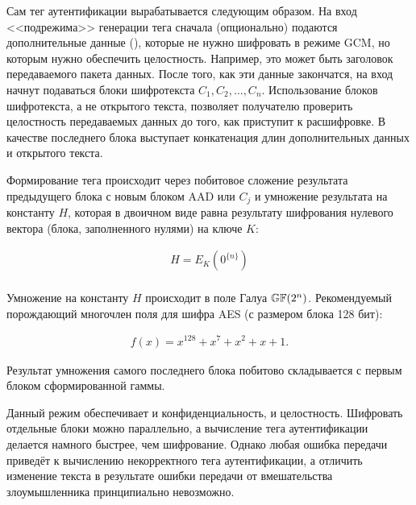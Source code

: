 Сам тег аутентификации вырабатывается следующим образом. На вход <<подрежима>> генерации тега сначала (опционально) подаются дополнительные данные (), которые не нужно шифровать в режиме GCM, но которым нужно обеспечить целостность. Например, это может быть заголовок передаваемого пакета данных. После того, как эти данные закончатся, на вход начнут подаваться блоки шифротекста $C_1, C_2, \dots, C_n$. Использование блоков шифротекста, а не открытого текста, позволяет получателю проверить целостность передаваемых данных до того, как приступит к расшифровке. В качестве последнего блока выступает конкатенация длин дополнительных данных и открытого текста.

Формирование тега происходит через побитовое сложение результата предыдущего блока с новым блоком AAD или $C_j$ и умножение результата на константу $H$, которая в двоичном виде равна результату шифрования нулевого вектора (блока, заполненного нулями) на ключе $K$:

\[ \begin{array}{l}
	H = E_K ( 0^{\{n\}} ) \\
\end{array} \]

Умножение на константу $H$ происходит в поле Галуа $\mathbb{GF}(2^{n})$. Рекомендуемый порождающий многочлен поля для шифра AES (с размером блока 128 бит):

\[ \begin{array}{l}
	f(x) = x^{128} + x^7 + x^2 + x + 1.
\end{array} \]

Результат умножения самого последнего блока побитово складывается с первым блоком сформированной гаммы.

Данный режим обеспечивает и конфиденциальность, и целостность. Шифровать отдельные блоки можно параллельно, а вычисление тега аутентификации делается намного быстрее, чем шифрование. Однако любая ошибка передачи приведёт к вычислению некорректного тега аутентификации, а отличить изменение текста в результате ошибки передачи от вмешательства злоумышленника принципиально невозможно.